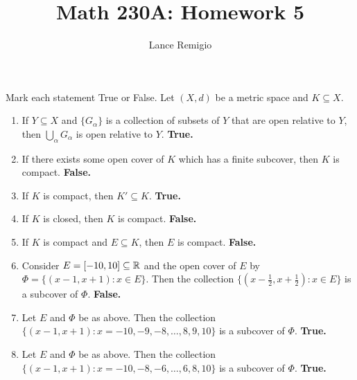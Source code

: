 \documentclass[a4paper]{article}
\title{Math 230A: Homework 5}
\author{Lance Remigio}
\begin{document}
\maketitle    
{}
\rhead{\thepage}

\begin{problem}
   Mark each statement True or False. Let \( (X,d) \) be a metric space and \( K \subseteq X  \). 
   \begin{enumerate}
       \item If \( Y \subseteq X   \) and \( \{ {G}_{\alpha} \}  \) is a collection of subsets of \( Y  \) that are open relative to \( Y  \), then \( \bigcup_{ \alpha }^{  } {G}_{\alpha} \) is open relative to \( Y  \). \textbf{True.}
        \item If there exists some open cover of \( K   \) which has a finite subcover, then \( K  \) is compact. \textbf{False.}
        \item If \( K  \) is compact, then \( K' \subseteq K  \). \textbf{True.}
        \item If \( K  \) is closed, then \( K  \) is compact. \textbf{False.}
        \item If \( K  \) is compact and \( E \subseteq K \), then \( E  \) is compact. \textbf{False.}
        \item Consider \( E = [-10,10] \subseteq \mathbb{R}  \) and the open cover of \( E  \) by \( \Phi = \{ (x-1,x + 1) : x \in E  \}  \). Then the collection \( \{ (x - \frac{ 1 }{ 2 }  , x + \frac{ 1 }{ 2 } ) : x \in E  \}  \) is a subcover of \( \Phi \). \textbf{False.}
        \item Let \( E  \) and \( \Phi \) be as above. Then the collection \( \{ (x-1, x+1): x = -10,-9,-8, \dots, 8, 9, 10 \}  \) is a subcover of \( \Phi \). \textbf{True.}
        \item Let \( E  \) and \( \Phi \) be as above. Then the collection \( \{ (x-1, x+1): x = -10,-8, -6, \dots, 6, 8, 10 \}  \) is a subcover of \( \Phi \). \textbf{True.}
   \end{enumerate}
\end{problem}
\end{document}
